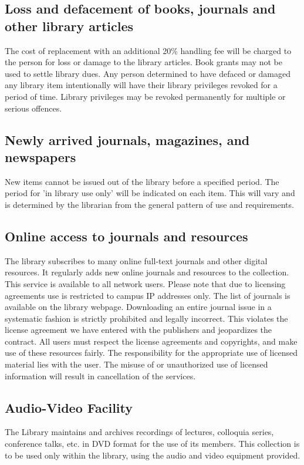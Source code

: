 \documentclass[a4paper,10pt]{article}
\begin{document}
\subsection{Loss and defacement of books, journals and other library articles}
The cost of
replacement with an additional 20\% handling fee will be charged to the person for loss or
damage to the library articles. Book grants may not be used to settle library dues. Any
person determined to have defaced or damaged any library item intentionally will have their
library privileges revoked for a period of time. Library privileges may be revoked
permanently for multiple or serious offences.

\subsection{ Newly arrived journals, magazines, and newspapers}
New items cannot be issued out of
the library before a specified period. The period for 'in library use only' will be indicated on
each item. This will vary and is determined by the librarian from the general pattern of use
and requirements.

\subsection{Online access to journals and resources}
The library subscribes to many online full-text
journals and other digital resources. It regularly adds new online journals and resources to
the collection. This service is available to all network users. Please note that due to licensing
agreements use is restricted to campus IP addresses only. The list of journals is available on
the library webpage. Downloading an entire journal issue in a systematic fashion is strictly
prohibited and legally incorrect. This violates the license agreement we have entered with
the publishers and jeopardizes the contract. All users must respect the license agreements
and copyrights, and make use of these resources fairly. The responsibility for the appropriate
use of licensed material lies with the user. The misuse of or unauthorized use of licensed
information will result in cancellation of the services.

\subsection{Audio-Video Facility}
The Library maintains and archives recordings of lectures, colloquia
series, conference talks, etc. in DVD format for the use of its members. This collection is to
be used only within the library, using the audio and video equipment provided.
\end{document}
